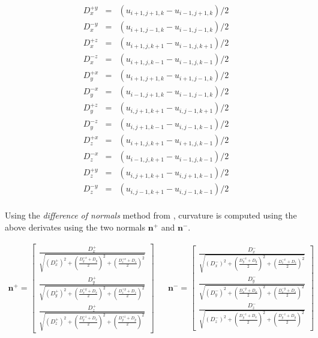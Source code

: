 \begin{eqnarray}
	D_x^{+y} &=& (u_{i+1,j+1,k}-u_{i-1,j+1,k})/2 \nonumber\\
	D_x^{-y} &=& (u_{i+1,j-1,k}-u_{i-1,j-1,k})/2 \nonumber\\
	D_x^{+z} &=& (u_{i+1,j,k+1}-u_{i-1,j,k+1})/2 \nonumber\\
	D_x^{-z} &=& (u_{i+1,j,k-1}-u_{i-1,j,k-1})/2 \nonumber\\
	D_y^{+x} &=& (u_{i+1,j+1,k}-u_{i+1,j-1,k})/2 \nonumber\\
	D_y^{-x} &=& (u_{i-1,j+1,k}-u_{i-1,j-1,k})/2 \nonumber\\
	D_y^{+z} &=& (u_{i,j+1,k+1}-u_{i,j-1,k+1})/2 \nonumber\\
	D_y^{-z} &=& (u_{i,j+1,k-1}-u_{i,j-1,k-1})/2 \nonumber\\
	D_z^{+x} &=& (u_{i+1,j,k+1}-u_{i+1,j,k-1})/2 \nonumber\\
	D_z^{-x} &=& (u_{i-1,j,k+1}-u_{i-1,j,k-1})/2 \nonumber\\
	D_z^{+y} &=& (u_{i,j+1,k+1}-u_{i,j+1,k-1})/2 \nonumber\\
	D_z^{-y} &=& (u_{i,j-1,k+1}-u_{i,j-1,k-1})/2 \nonumber\\
\end{eqnarray}

Using the \textit{difference of normals} method from \cite{Lefohn04astreaming}, curvature is computed using the above derivates using the two normals $\textbf{n}^+$ and $\textbf{n}^-$.

\begin{eqnarray}
\textbf{n}^+ = \left[
  \begin{array}{ c }
     \frac{D_x^+}{\sqrt{(D_x^+)^2 + {(\frac{D_y^{+x}+D_y}{2})}^2 +{(\frac{D_z^{+x}+D_z}{2})}^2  }}  \\[2em]
     \frac{D_y^+}{\sqrt{(D_y^+)^2 + {(\frac{D_x^{+y}+D_x}{2})}^2 +{(\frac{D_z^{+y}+D_z}{2})}^2  }}  \\[2em]
     \frac{D_z^+}{\sqrt{(D_z^+)^2 + {(\frac{D_y^{+z}+D_x}{2})}^2 +{(\frac{D_y^{+z}+D_y}{2})}^2  }}  
  \end{array} \right] &&
\textbf{n}^- = \left[
  \begin{array}{ c }
     \frac{D_x^-}{\sqrt{(D_x^-)^2 + {(\frac{D_y^{-x}+D_y}{2})}^2 +{(\frac{D_z^{-x}+D_z}{2})}^2  }}  \\[2em]
     \frac{D_y^-}{\sqrt{(D_y^-)^2 + {(\frac{D_x^{-y}+D_x}{2})}^2 +{(\frac{D_z^{-y}+D_z}{2})}^2  }}  \\[2em]
     \frac{D_z^-}{\sqrt{(D_z^-)^2 + {(\frac{D_y^{-z}+D_x}{2})}^2 +{(\frac{D_y^{-z}+D_y}{2})}^2  }}  
  \end{array} \right] \nonumber
\end{eqnarray}

